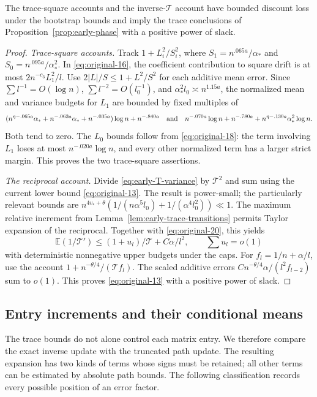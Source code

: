 \begin{lemma}\label{lem:early-trace-accounts}
The trace-square accounts and the inverse-\(\mathcal T\) account have
bounded discount loss under the bootstrap bounds and imply the trace
conclusions of Proposition~\ref{prop:early-phase} with a positive power
of slack.
\end{lemma}
\begin{proof}
\emph{Trace-square accounts.}
Track \(1+L_i^2/S_i^2\), where
\(S_1=n^{.065a}/\alpha_*\) and
\(S_0=n^{.095a}/\alpha_*^2\).
In \eqref{eq:original-16}, the coefficient contribution to square drift
is at most \(2n^{-c_3}L_1^2/l\). Use
\(2|L|/S\le1+L^2/S^2\) for each additive mean error.
Since \(\sum l^{-1}=O(\log n)\),
\(\sum l^{-2}=O(l_0^{-1})\), and
\(\alpha_*^2l_0\asymp n^{1.15a}\), the normalized mean and variance
budgets for \(L_1\) are bounded by fixed multiples of
\[
 (n^{\eta-.065a}\alpha_*+n^{-.063a}\alpha_*+
   n^{-.035a})\log n+n^{-.840a}
 \quad\hbox{and}\quad
 n^{-.070a}\log n+n^{-.780a}+n^{\eta-.130a}\alpha_*^2\log n.
\]
Both tend to zero. The \(L_0\) bounds follow from
\eqref{eq:original-18}: the term involving \(L_1\) loses at most
\(n^{-.020a}\log n\), and every other normalized term has a larger
strict margin. This proves the two trace-square assertions.

\emph{The reciprocal account.}
Divide \eqref{eq:early-T-variance} by \(\mathcal T^2\) and sum
using the current lower bound \eqref{eq:original-13}. The result is
power-small; the particularly relevant bounds are
\(n^{4v_*+\theta}(1/(n\alpha^5 l_0)+1/(\alpha^4 l_0^2))\ll1\).
The maximum relative increment from
Lemma~\ref{lem:early-trace-transitions} permits Taylor expansion of
the reciprocal. Together with \eqref{eq:original-20}, this yields
\[
 \mathbb E(1/\mathcal T')\le (1+u_l)/\mathcal T + C\alpha/l^2,
 \qquad \sum u_l=o(1)
\]
with deterministic nonnegative upper budgets under the caps.
For \(f_l=1/n+\alpha/l\), use the account
\(1+n^{-\theta/4}/(\mathcal T f_l)\). The scaled additive errors
\(Cn^{-\theta/4}\alpha/(l^2f_{l-2})\) sum to \(o(1)\).
This proves \eqref{eq:original-13} with a positive power of slack.

\end{proof}

\subsection{Entry increments and their conditional means}

The trace bounds do not alone control each matrix entry. We therefore
compare the exact inverse update with the truncated path update. The
resulting expansion has two kinds of terms whose signs must be retained;
all other terms can be estimated by absolute path bounds. The following
classification records every possible position of an error factor.

